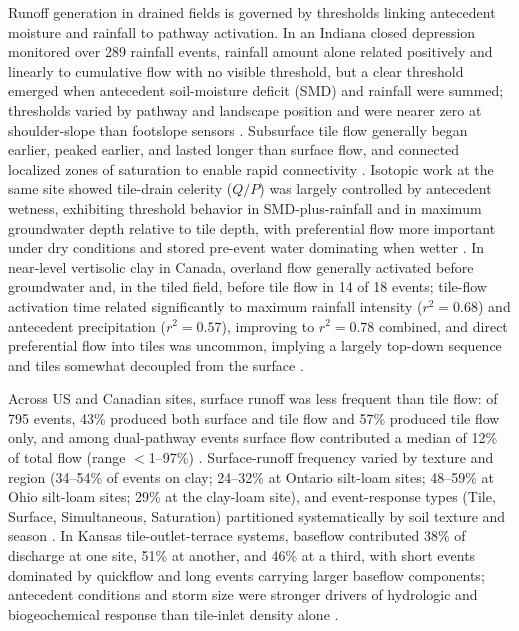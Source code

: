 Runoff generation in drained fields is governed by thresholds linking antecedent moisture and rainfall to pathway activation. In an Indiana closed depression monitored over 289 rainfall events, rainfall amount alone related positively and linearly to cumulative flow with no visible threshold, but a clear threshold emerged when antecedent soil-moisture deficit (SMD) and rainfall were summed; thresholds varied by pathway and landscape position and were nearer zero at shoulder-slope than footslope sensors \parencite{Williams2019}. Subsurface tile flow generally began earlier, peaked earlier, and lasted longer than surface flow, and connected localized zones of saturation to enable rapid connectivity \parencite{Williams2019}. Isotopic work at the same site showed tile-drain celerity ($Q/P$) was largely controlled by antecedent wetness, exhibiting threshold behavior in SMD-plus-rainfall and in maximum groundwater depth relative to tile depth, with preferential flow more important under dry conditions and stored pre-event water dominating when wetter \parencite{Williams2021}. In near-level vertisolic clay in Canada, overland flow generally activated before groundwater and, in the tiled field, before tile flow in 14 of 18 events; tile-flow activation time related significantly to maximum rainfall intensity ($r^2=0.68$) and antecedent precipitation ($r^2=0.57$), improving to $r^2=0.78$ combined, and direct preferential flow into tiles was uncommon, implying a largely top-down sequence and tiles somewhat decoupled from the surface \parencite{Kokulan2019}.

Across US and Canadian sites, surface runoff was less frequent than tile flow: of 795 events, 43\% produced both surface and tile flow and 57\% produced tile flow only, and among dual-pathway events surface flow contributed a median of 12\% of total flow (range $<$1--97\%) \parencite{Macrae2019}. Surface-runoff frequency varied by texture and region (34--54\% of events on clay; 24--32\% at Ontario silt-loam sites; 48--59\% at Ohio silt-loam sites; 29\% at the clay-loam site), and event-response types (Tile, Surface, Simultaneous, Saturation) partitioned systematically by soil texture and season \parencite{Macrae2019}. In Kansas tile-outlet-terrace systems, baseflow contributed 38\% of discharge at one site, 51\% at another, and 46\% at a third, with short events dominated by quickflow and long events carrying larger baseflow components; antecedent conditions and storm size were stronger drivers of hydrologic and biogeochemical response than tile-inlet density alone \parencite{Stops2022}.

